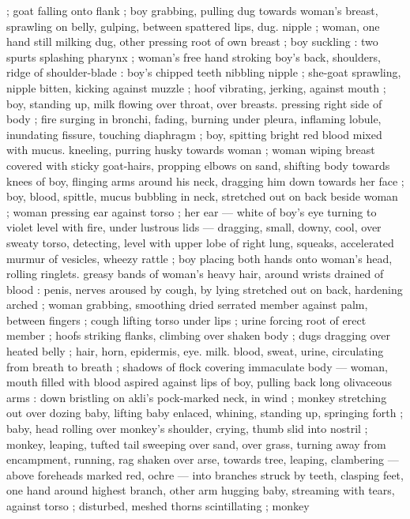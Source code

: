 {; goat falling onto flank ; boy grabbing, pulling dug towards woman's 
breast, sprawling on belly, gulping, between spattered lips, dug. 
nipple ; woman, one hand still milking dug, other pressing root of 
own breast ; boy suckling : two spurts splashing pharynx ; woman's 
free hand stroking boy's back, shoulders, ridge of shoulder-blade : 
boy's chipped teeth nibbling nipple ; she-goat sprawling, nipple 
bitten, kicking against muzzle ; hoof vibrating, jerking, against 
mouth ; boy, standing up, milk flowing over throat, over breasts. 
pressing right side of body ; fire surging in bronchi, fading, burning 
under pleura, inflaming lobule, inundating fissure, touching 
diaphragm ; boy, spitting bright red blood mixed with mucus. 
kneeling, purring husky towards woman ; woman wiping breast 
covered with sticky goat-hairs, propping elbows on sand, shifting 
body towards knees of boy, flinging arms around his neck, dragging 
him down towards her face ; boy, blood, spittle, mucus bubbling in 
neck, stretched out on back beside woman ; woman pressing ear 
against torso ; her ear --- white of boy's eye turning to violet level 
with fire, under lustrous lids --- dragging, small, downy, cool, over 
sweaty torso, detecting, level with upper lobe of right lung, squeaks, 
accelerated murmur of vesicles, wheezy rattle ; boy placing both 
hands onto woman's head, rolling ringlets. greasy bands of woman's 
heavy hair, around wrists drained of blood : penis, nerves aroused by 
cough, by lying stretched out on back, hardening arched ; woman 
grabbing, smoothing dried serrated member against palm, between 
fingers ; cough lifting torso under lips ; urine forcing root of erect 
member ; hoofs striking flanks, climbing over shaken body ; dugs 
dragging over heated belly ; hair, horn, epidermis, eye. milk. blood, 
sweat, urine, circulating from breath to breath ; shadows of flock 
covering immaculate body --- woman, mouth filled with blood aspired 
against lips of boy, pulling back long olivaceous arms : down bristling 
on akli's pock-marked neck, in wind ; monkey stretching out over 
dozing baby, lifting baby enlaced, whining, standing up, springing 
forth ; baby, head rolling over monkey's shoulder, crying, thumb slid 
into nostril ; monkey, leaping, tufted tail sweeping over sand, over 
grass, turning away from encampment, running, rag shaken over 
arse, towards tree, leaping, clambering --- above foreheads marked 
red, ochre --- into branches struck by teeth, clasping feet, one hand 
around highest branch, other arm hugging baby, streaming with 
tears, against torso ; disturbed, meshed thorns scintillating ; monkey 
}
